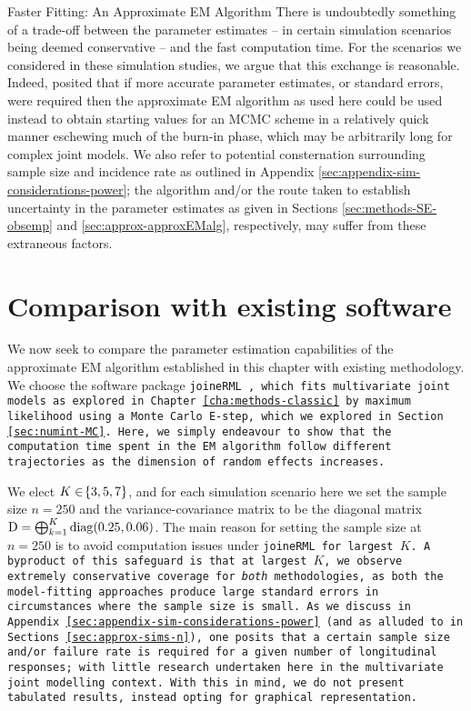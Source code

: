 \begin{chapter}{\label{cha:approx}Faster Fitting: An Approximate EM Algorithm}
  There is undoubtedly something of a trade-off between the parameter estimates -- in certain simulation scenarios being deemed conservative -- and the fast computation time. For the scenarios we considered in these simulation studies, we argue that this exchange is reasonable. Indeed, \citet{Bernhardt15} posited that if more accurate parameter estimates, or standard errors, were required then the approximate EM algorithm as used here could be used instead to obtain starting values for \eg an MCMC scheme in a relatively quick manner \ie eschewing much of the burn-in phase, which may be arbitrarily long for complex joint models. We also refer to potential consternation surrounding sample size and incidence rate as outlined in Appendix \ref{sec:appendix-sim-considerations-power}; the algorithm and/or the route taken to establish uncertainty in the parameter estimates as given in Sections \ref{sec:methods-SE-obsemp} and \ref{sec:approx-approxEMalg}, respectively, may suffer from these extraneous factors.
  
  \section{Comparison with existing software}\label{sec:approx-comparisons}
  We now seek to compare the parameter estimation capabilities of the approximate EM algorithm established in this chapter with existing methodology. We choose the software package \tt{joineRML} \citep{Hickey2018}, which fits multivariate joint models as explored in Chapter \ref{cha:methods-classic} by maximum likelihood using a Monte Carlo E-step, which we explored in Section \ref{sec:numint-MC}. Here, we simply endeavour to show that the computation time spent in the EM algorithm follow different trajectories as the dimension of random effects increases.

  We elect $K\in\!\left\{3,5,7\right\}$, and for each simulation scenario here we set the sample size $n=250$ and the variance-covariance matrix to be the diagonal matrix $\mathrm{D}=\bigoplus_{k=1}^K \mathrm{diag}\!\left(0.25, 0.06\right)$. The main reason for setting the sample size at $n=250$ is to avoid computation issues under \tt{joineRML} for largest $K$. A byproduct of this safeguard is that at largest $K$, we observe extremely conservative coverage for \textit{both} methodologies, as both the model-fitting approaches produce large standard errors in circumstances where the sample size is small. As we discuss in Appendix \ref{sec:appendix-sim-considerations-power} (and as alluded to in Sections \ref{sec:approx-sims-n}), one posits that a certain sample size and/or failure rate is required for a given number of longitudinal responses; with little research undertaken here in the multivariate joint modelling context. With this in mind, we do not present tabulated results, instead opting for graphical representation.


\end{chapter}
